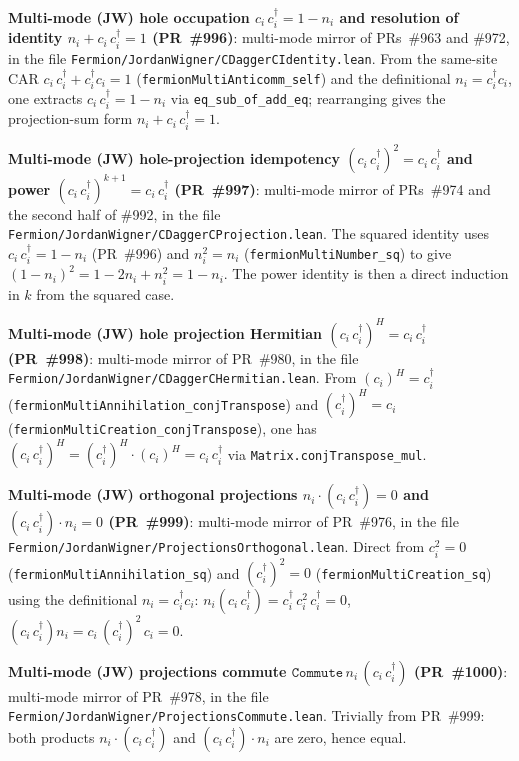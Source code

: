 \documentclass[a4paper,11pt]{article}
\begin{document}
\textbf{Multi-mode (JW) hole occupation $c_i\,c_i^\dagger = 1 -
n_i$ and resolution of identity $n_i + c_i\,c_i^\dagger = 1$
(PR~\#996)}: multi-mode mirror of PRs~\#963 and \#972, in the
file \texttt{Fermion/JordanWigner/CDaggerCIdentity.lean}. From
the same-site CAR $c_i\,c_i^\dagger + c_i^\dagger c_i = 1$
(\texttt{fermionMultiAnticomm\_self}) and the definitional
$n_i = c_i^\dagger c_i$, one extracts $c_i\,c_i^\dagger = 1 -
n_i$ via \texttt{eq\_sub\_of\_add\_eq}; rearranging gives the
projection-sum form $n_i + c_i\,c_i^\dagger = 1$.

\textbf{Multi-mode (JW) hole-projection idempotency
$(c_i\,c_i^\dagger)^2 = c_i\,c_i^\dagger$ and power
$(c_i\,c_i^\dagger)^{k+1} = c_i\,c_i^\dagger$ (PR~\#997)}:
multi-mode mirror of PRs~\#974 and the second half of \#992,
in the file
\texttt{Fermion/JordanWigner/CDaggerCProjection.lean}. The
squared identity uses $c_i\,c_i^\dagger = 1 - n_i$ (PR~\#996)
and $n_i^2 = n_i$ (\texttt{fermionMultiNumber\_sq}) to give
$(1 - n_i)^2 = 1 - 2n_i + n_i^2 = 1 - n_i$. The power identity
is then a direct induction in $k$ from the squared case.

\textbf{Multi-mode (JW) hole projection Hermitian
$(c_i\,c_i^\dagger)^H = c_i\,c_i^\dagger$ (PR~\#998)}:
multi-mode mirror of PR~\#980, in the file
\texttt{Fermion/JordanWigner/CDaggerCHermitian.lean}. From
$(c_i)^H = c_i^\dagger$
(\texttt{fermionMultiAnnihilation\_conjTranspose}) and
$(c_i^\dagger)^H = c_i$
(\texttt{fermionMultiCreation\_conjTranspose}), one has
$(c_i\,c_i^\dagger)^H = (c_i^\dagger)^H \cdot (c_i)^H =
c_i\,c_i^\dagger$ via \texttt{Matrix.conjTranspose\_mul}.

\textbf{Multi-mode (JW) orthogonal projections
$n_i\cdot(c_i\,c_i^\dagger) = 0$ and
$(c_i\,c_i^\dagger)\cdot n_i = 0$ (PR~\#999)}: multi-mode
mirror of PR~\#976, in the file
\texttt{Fermion/JordanWigner/ProjectionsOrthogonal.lean}. Direct
from $c_i^2 = 0$ (\texttt{fermionMultiAnnihilation\_sq}) and
$(c_i^\dagger)^2 = 0$ (\texttt{fermionMultiCreation\_sq}) using
the definitional $n_i = c_i^\dagger c_i$:
$n_i(c_i\,c_i^\dagger) = c_i^\dagger\,c_i^2\,c_i^\dagger = 0$,
$(c_i\,c_i^\dagger)n_i = c_i\,(c_i^\dagger)^2\,c_i = 0$.

\textbf{Multi-mode (JW) projections commute
$\texttt{Commute}\,n_i\,(c_i\,c_i^\dagger)$ (PR~\#1000)}:
multi-mode mirror of PR~\#978, in the file
\texttt{Fermion/JordanWigner/ProjectionsCommute.lean}. Trivially
from PR~\#999: both products $n_i\cdot(c_i\,c_i^\dagger)$ and
$(c_i\,c_i^\dagger)\cdot n_i$ are zero, hence equal.
\end{document}
